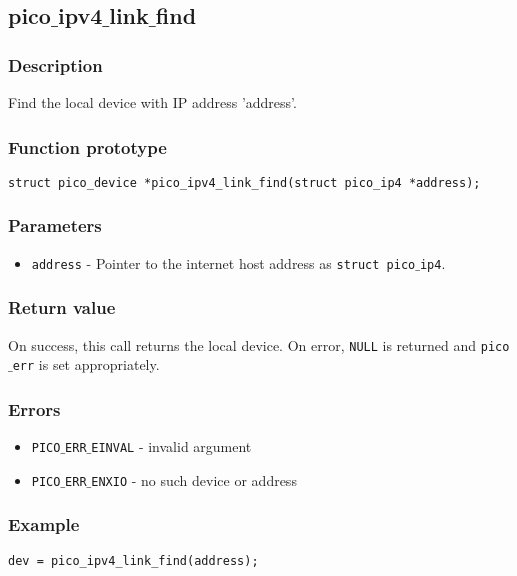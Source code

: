 \subsection{pico$\_$ipv4$\_$link$\_$find}

\subsubsection*{Description}
Find the local device with IP address 'address'.

\subsubsection*{Function prototype}
\begin{verbatim}
struct pico_device *pico_ipv4_link_find(struct pico_ip4 *address);
\end{verbatim}

\subsubsection*{Parameters}
\begin{itemize}[noitemsep]
\item \texttt{address} - Pointer to the internet host address as \texttt{struct pico$\_$ip4}.
\end{itemize}

\subsubsection*{Return value}
On success, this call returns the local device.
On error, \texttt{NULL} is returned and \texttt{pico$\_$err} is set appropriately.

\subsubsection*{Errors}
\begin{itemize}[noitemsep]
\item \texttt{PICO$\_$ERR$\_$EINVAL} - invalid argument
\item \texttt{PICO$\_$ERR$\_$ENXIO} - no such device or address
\end{itemize}

\subsubsection*{Example}
\begin{verbatim}
dev = pico_ipv4_link_find(address);
\end{verbatim}



